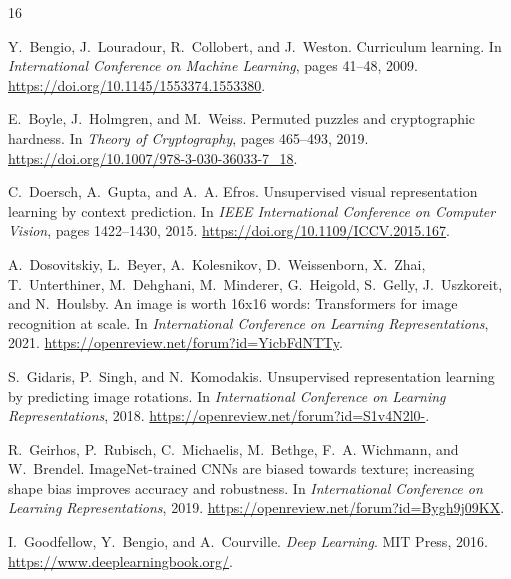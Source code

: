 \documentclass[12pt]{article}
\begin{document}
\clearpage
\onecolumn
\begin{thebibliography}{16}

Y.~Bengio, J.~Louradour, R.~Collobert, and J.~Weston.
\newblock Curriculum learning.
\newblock In \emph{International Conference on Machine Learning}, pages 41--48, 2009.
\newblock \url{https://doi.org/10.1145/1553374.1553380}.

E.~Boyle, J.~Holmgren, and M.~Weiss.
\newblock Permuted puzzles and cryptographic hardness.
\newblock In \emph{Theory of Cryptography}, pages 465--493, 2019.
\newblock \url{https://doi.org/10.1007/978-3-030-36033-7_18}.

C.~Doersch, A.~Gupta, and A.~A. Efros.
\newblock Unsupervised visual representation learning by context prediction.
\newblock In \emph{IEEE International Conference on Computer Vision}, pages 1422--1430, 2015.
\newblock \url{https://doi.org/10.1109/ICCV.2015.167}.

A.~Dosovitskiy, L.~Beyer, A.~Kolesnikov, D.~Weissenborn, X.~Zhai, T.~Unterthiner, M.~Dehghani, M.~Minderer, G.~Heigold, S.~Gelly, J.~Uszkoreit, and N.~Houlsby.
\newblock An image is worth 16x16 words: Transformers for image recognition at scale.
\newblock In \emph{International Conference on Learning Representations}, 2021.
\newblock \url{https://openreview.net/forum?id=YicbFdNTTy}.

S.~Gidaris, P.~Singh, and N.~Komodakis.
\newblock Unsupervised representation learning by predicting image rotations.
\newblock In \emph{International Conference on Learning Representations}, 2018.
\newblock \url{https://openreview.net/forum?id=S1v4N2l0-}.

R.~Geirhos, P.~Rubisch, C.~Michaelis, M.~Bethge, F.~A. Wichmann, and W.~Brendel.
\newblock ImageNet-trained CNNs are biased towards texture; increasing shape bias improves accuracy and robustness.
\newblock In \emph{International Conference on Learning Representations}, 2019.
\newblock \url{https://openreview.net/forum?id=Bygh9j09KX}.

I.~Goodfellow, Y.~Bengio, and A.~Courville.
\newblock \emph{Deep Learning}.
\newblock MIT Press, 2016.
\newblock \url{https://www.deeplearningbook.org/}.


\end{thebibliography}
\end{document}

